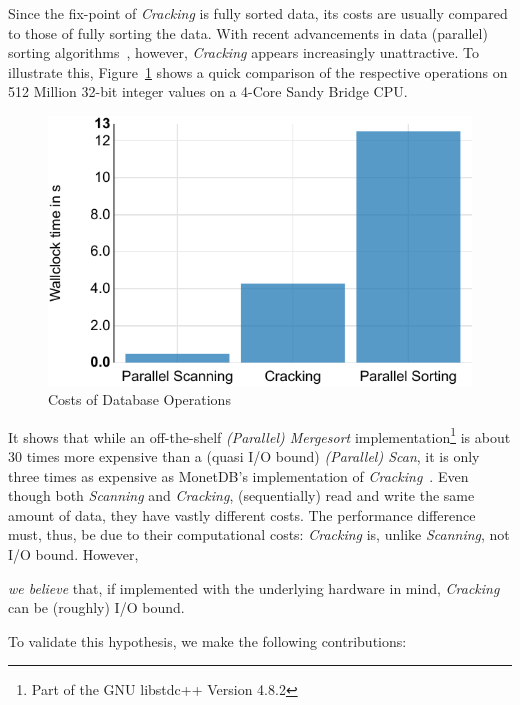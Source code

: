 Since the fix-point of \emph{Cracking} is fully sorted data, its
costs are usually compared to those of fully sorting the data. With
recent advancements in data (parallel) sorting
algorithms~\cite{sorting_SIMD}, however, \emph{Cracking} appears
increasingly unattractive. To illustrate this,
Figure~\ref{fig:motivation} shows a quick comparison of the respective
operations on 512 Million 32-bit integer values on a 4-Core
Sandy Bridge CPU.
%
\begin{figure}[t!]
  \centering
  \includegraphics[width=.9\columnwidth]{Figures/damon/Motivation}
  \caption{Costs of Database Operations}
\vspace{-0.2 in}
  \label{fig:motivation}
\end{figure}
%
It shows that while an off-the-shelf \emph{(Parallel) Mergesort}
implementation\footnote{Part of the GNU libstdc++ Version 4.8.2} is
about 30 times more expensive than a (quasi I/O bound) \emph{(Parallel)
  Scan}, it is only three times as expensive as MonetDB's
implementation of \emph{Cracking}~\cite{DBLP:conf/cidr/IdreosKM07}.
Even though both \emph{Scanning} and \emph{Cracking},
(sequentially) read and write the same amount of data, they have
vastly different costs. The performance difference must, thus, be
due to their computational costs: \emph{Cracking}
is, unlike \emph{Scanning}, not I/O bound. However,\\[-2ex]
\begin{center}
  \begin{minipage}{.95\linewidth}
    \emph{we believe} that, if implemented with the underlying
    hardware in mind, \emph{Cracking} can be (roughly) I/O bound.
\end{minipage}
\end{center}
\vspace{1ex}
%
%
To validate this hypothesis, we make the following contributions:
